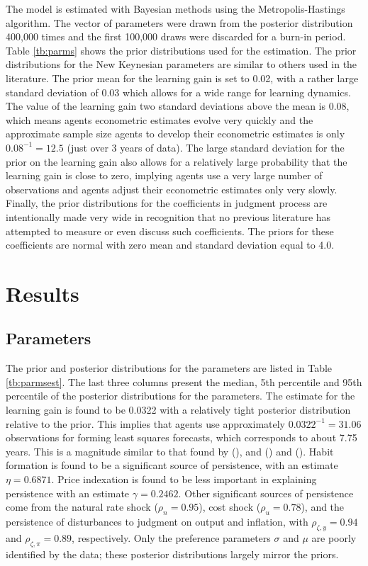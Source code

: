 \documentclass[10pt]{article}
\newcommand{\citee}[1]{\citeauthor*{#1} (\citeyear{#1})}
\begin{document}
{The model is estimated with Bayesian methods using the Metropolis-Hastings algorithm.  The vector of parameters were drawn from the posterior distribution 400,000 times and the first 100,000 draws were discarded for a burn-in period.  Table \ref{tb:parms} shows the prior distributions used for the estimation.  The prior distributions for the New Keynesian parameters are similar to others used in the literature.  The prior mean for the learning gain is set to 0.02, with a rather large standard deviation of 0.03 which allows for a wide range for learning dynamics.  The value of the learning gain two standard deviations above the mean is 0.08, which means agents econometric estimates evolve very quickly and the approximate sample size agents to develop their econometric estimates is only $0.08^{-1} = 12.5$ (just over 3 years of data).  The large standard deviation for the prior on the learning gain also allows for a relatively large probability that the learning gain is close to zero, implying agents use a very large number of observations and agents adjust their econometric estimates only very slowly.  Finally, the prior distributions for the coefficients in judgment process are intentionally made very wide in recognition that no previous literature has attempted to measure or even discuss such coefficients.  The priors for these coefficients are normal with zero mean and standard deviation equal to 4.0.   

\section{Results}
\subsection{Parameters}
The prior and posterior distributions for the parameters are listed in Table \ref{tb:parmsest}.  The last three columns present the median, 5th percentile and 95th percentile of the posterior distributions for the parameters.  The estimate for the learning gain is found to be 0.0322 with a relatively tight posterior distribution relative to the prior.  This implies that agents use approximately $0.0322^{-1} = 31.06$ observations for forming least squares forecasts, which corresponds to about 7.75 years.  This is a magnitude similar to that found by \citee{milani2007}, and \citee{slobodyan_wouters_2007} and (\citeyear{slobodyan_wouters_2008}).  Habit formation is found to be a significant source of persistence, with an estimate $\eta=0.6871$.  Price indexation is found to be less important in explaining persistence with an estimate $\gamma=0.2462$.  Other significant sources of persistence come from the natural rate shock ($\rho_n = 0.95$), cost shock ($\rho_u=0.78$), and the persistence of disturbances to judgment on output and inflation, with $\rho_{\zeta,y}=0.94$ and $\rho_{\zeta,\pi}=0.89$, respectively.  Only the preference parameters $\sigma$ and $\mu$ are poorly identified by the data; these posterior distributions largely mirror the priors. 

}
\end{document}
